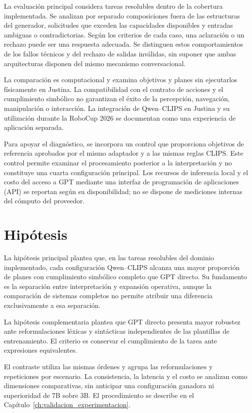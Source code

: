 La evaluación principal considera tareas resolubles dentro de la cobertura implementada. Se analizan por separado composiciones fuera de las estructuras del generador, solicitudes que exceden las capacidades disponibles y entradas ambiguas o contradictorias. Según los criterios de cada caso, una aclaración o un rechazo puede ser una respuesta adecuada. Se distinguen estos comportamientos de los fallos técnicos y del rechazo de salidas inválidas, sin suponer que ambas arquitecturas disponen del mismo mecanismo conversacional.

La comparación es computacional y examina objetivos y planes sin ejecutarlos físicamente en Justina. La compatibilidad con el contrato de acciones y el cumplimiento simbólico no garantizan el éxito de la percepción, navegación, manipulación o interacción. La integración de Qwen--CLIPS en Justina y su utilización durante la RoboCup 2026 se documentan como una experiencia de aplicación separada.

Para apoyar el diagnóstico, se incorpora un control que proporciona objetivos de referencia aprobados por el mismo adaptador y a las mismas reglas CLIPS. Este control permite examinar el procesamiento posterior a la interpretación y no constituye una cuarta configuración principal. Los recursos de inferencia local y el costo del acceso a GPT mediante una interfaz de programación de aplicaciones (API) se reportan según su disponibilidad; no se dispone de mediciones internas del cómputo del proveedor.

\section{Hipótesis}

La hipótesis principal plantea que, en las tareas resolubles del dominio implementado, cada configuración Qwen--CLIPS alcanza una mayor proporción de planes con cumplimiento simbólico completo que GPT directo. Su fundamento es la separación entre interpretación y expansión operativa, aunque la comparación de sistemas completos no permite atribuir una diferencia exclusivamente a esa separación.

La hipótesis complementaria plantea que GPT directo presenta mayor robustez ante reformulaciones léxicas y sintácticas independientes de las plantillas de entrenamiento. El criterio es conservar el cumplimiento de la tarea ante expresiones equivalentes.

El contraste utiliza las mismas órdenes y agrupa las reformulaciones y repeticiones por escenario. La consistencia, la latencia y el costo se analizan como dimensiones comparativas, sin anticipar una configuración ganadora ni superioridad de 7B sobre 3B. El procedimiento se describe en el Capítulo~\ref{ch:validacion_experimentacion}.

